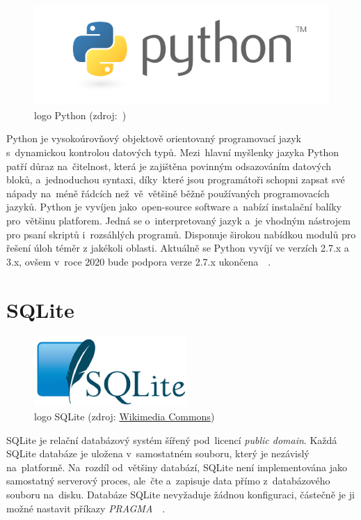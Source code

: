 	\begin{figure}[H]
		\centering
		\includegraphics[width=.5\textwidth]{./pictures/python_logo.png}
      	\caption[logo Python]{logo Python (zdroj:~\citep{python})}
		\label{fig:python_logo}
 	\end{figure}

Python je vysokoúrovňový objektově orientovaný programovací jazyk s~dynamickou kontrolou datových typů. Mezi~hlavní myšlenky jazyka Python patří důraz na~čitelnost, která je zajištěna povinným odsazováním datových bloků, a~jednoduchou syntaxi, díky~které jsou programátoři schopni zapsat své nápady na~méně řádcích než~vě~většině běžně používaných programovacích jazyků. Python je vyvíjen jako~open-source software a~nabízí instalační balíky pro~většinu platforem. Jedná se o~interpretovaný jazyk a~je vhodným nástrojem pro psaní skriptů i~rozsáhlých programů. Disponuje širokou nabídkou modulů pro řešení úloh téměr z jakékoli oblasti. Aktuálně se Python vyvíjí ve verzích 2.7.x a 3.x, ovšem v~roce 2020 bude podpora verze 2.7.x ukončena~\citep{python}~\citep{wiki_python}.

\section{SQLite}
\label{sqlite}

	\begin{figure}[H]
		\centering
		\includegraphics[width=.2\textwidth]{./pictures/sqlite_logo.png}
      	\caption[logo SQLite]{logo SQLite (zdroj: \href{https://commons.wikimedia.org/wiki/File:SQLite_Logo_4.png}{Wikimedia Commons})}
		\label{fig:sqlite_logo}
 	\end{figure}

SQLite je relační databázový systém šířený pod~licencí \textit{public domain}. Každá SQLite databáze je uložena v~samostatném souboru, který je nezávislý na~platformě. Na~rozdíl od~většiny databází, SQLite není implementována jako samostatný serverový proces, ale~čte a~zapisuje data přímo z~databázového souboru na~disku. Databáze SQLite nevyžaduje žádnou konfiguraci, částečně je ji možné nastavit příkazy \textit{PRAGMA}~\citep{sqlite}~\citep{wiki_sqlite}.

